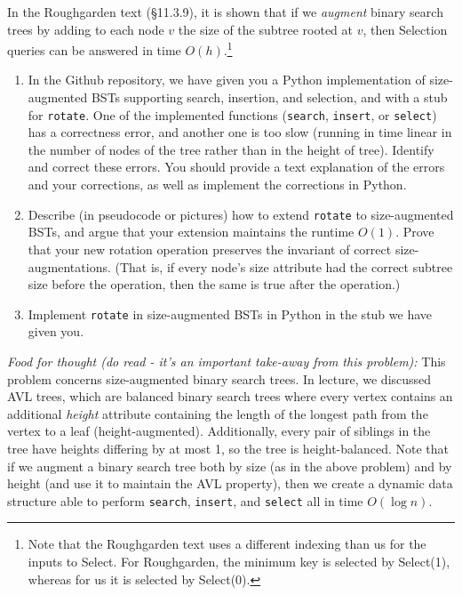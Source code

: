 \documentclass[11pt]{article}
\begin{document}
\begin{enumerate}
    In the Roughgarden text (\S11.3.9), it is shown that if we {\em augment} binary search trees by adding to each node $v$ the size of the subtree rooted at $v$, then Selection queries can be answered in time $O(h)$.\footnote{Note that the Roughgarden text uses a different indexing than us for the inputs to Select. For Roughgarden, the minimum key is selected by Select(1), whereas for us it is selected by Select(0).}
    
    \begin{enumerate}
        \item In the Github repository, we have given you a Python implementation of size-augmented BSTs supporting search, insertion, and selection, and with a stub for \texttt{rotate}. One of the implemented functions (\texttt{search}, \texttt{insert}, or \texttt{select}) has a correctness error, and another one is too slow (running in time linear in the number of nodes of the tree rather than in the height of tree). Identify and correct these errors. You should provide a text explanation of the errors and your corrections, as well as implement the corrections in Python.
        
        \item Describe (in pseudocode or pictures) how to extend \texttt{rotate} to size-augmented BSTs, and argue that your extension maintains the runtime $O(1)$. Prove that your new rotation operation preserves the invariant of correct size-augmentations. (That is, if every node's size attribute had the correct subtree size before the operation, then the same is true after the operation.)
        
        \item Implement \texttt{rotate} in size-augmented BSTs in Python in the stub we have given you.
    

    \end{enumerate}
    
    \emph{Food for thought (do read - it's an important take-away from this problem):} This problem concerns size-augmented binary search trees. In lecture, we discussed AVL trees, which are balanced binary search trees where every vertex contains an additional \textit{height} attribute containing the length of the longest path from the vertex to a leaf (height-augmented). Additionally, every pair of siblings in the tree have heights differing by at most 1, so the tree is height-balanced. Note that if we augment a binary search tree both by size (as in the above problem) and by height (and use it to maintain the AVL property), then we create a dynamic data structure able to perform \texttt{search}, \texttt{insert}, and \texttt{select} all in time $O(\log n)$. 


\end{enumerate}
\end{document}
